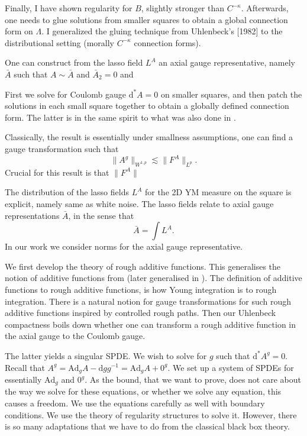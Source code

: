 \documentclass[12pt]{article}
\numberwithin{equation}{section}
\theoremstyle{definition}
\theoremstyle{remark}
\newcommand{\Ad}{\mathrm{Ad}}
\newcommand{\diff}{\mathrm{d}}
\newcommand{\1}{\mathbf 1}
\newcommand{\<}{\langle}
\renewcommand{\>}{\rangle}
\begin{document}
Finally, I have shown regularity for $B$, slightly stronger than $C^{-\kappa}$. Afterwards, one needs to glue solutions from smaller squares to obtain a global connection form on $\Lambda$. I generalized the gluing technique from Uhlenbeck's [1982] to the distributional setting (morally $C^{-\kappa}$ connection forms).


\newpage 



One can construct from the lasso field $L^A$ an axial gauge representative, namely $\bar A$ such that $A\sim \bar A$ and $\bar A_2=0$ and  






First we solve for Coulomb gauge $\diff^*A=0$ on smaller squares, and then patch the solutions in each small square together to obtain a globally defined connection form. The latter is in the same spirit to what was also done in \cite{Uhlenbeck82}. 


Classically, the result is essentially under smallness assumptions, one can find a gauge transformation such that 
\[
\|A^g\|_{W^{1,p}}\lesssim \|F^A\|_{L^p}.
\]
Crucial for this result is that $\|F^A\|$



The distribution of the lasso fields $L^A$ for the 2D YM measure on the square is explicit, namely same as white noise. The lasso fields relate to axial gauge representations $\bar A$, in the sense that 
\[
\bar A=\int L^A. 
\]
In our work we consider norms for the axial gauge representative. 

We first develop the theory of rough additive functions. This generalises the notion of additive functions from \cite{Chevyrev19} (later generalised in \cite{CCHS2d}). The definition of additive functions to rough additive functions, is how Young integration is to rough integration. There is a natural notion for gauge transformations for such rough additive functions inspired by controlled rough paths. Then our Uhlenbeck compactness boils down whether one can transform a rough additive function in the axial gauge to the Coulomb gauge. 

The latter yields a singular SPDE. We wish to solve for $g$ such that $\diff^*A^g=0$. Recall that $A^g=\Ad_gA-\diff gg^{-1}=\Ad_gA+0^g$. We set up a system of SPDEs for essentially $\Ad_g$ and $0^g$. As the bound, that we want to prove, does not care about the way we solve for these equations, or whether we solve any equation, this causes a freedom. We use the equations carefully as well with boundary conditions. We use the theory of regularity structures to solve it. However, there is so many adaptations that we have to do from the classical black box theory. 
\end{document}

